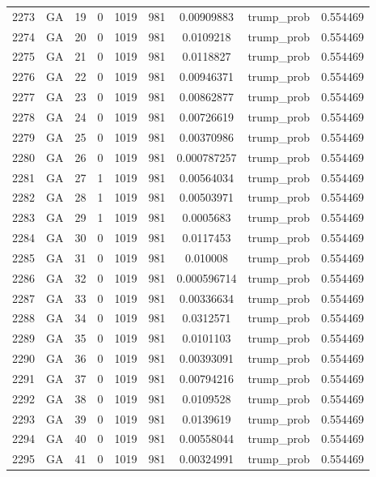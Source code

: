 \documentclass[12pt,a4paper]{article}
\begin{document}
\begin{tabular}{r|cccccccc}
	2273 & GA & 19 & 0 & 1019 & 981 & 0.00909883 & trump\_prob & 0.554469 \\
	2274 & GA & 20 & 0 & 1019 & 981 & 0.0109218 & trump\_prob & 0.554469 \\
	2275 & GA & 21 & 0 & 1019 & 981 & 0.0118827 & trump\_prob & 0.554469 \\
	2276 & GA & 22 & 0 & 1019 & 981 & 0.00946371 & trump\_prob & 0.554469 \\
	2277 & GA & 23 & 0 & 1019 & 981 & 0.00862877 & trump\_prob & 0.554469 \\
	2278 & GA & 24 & 0 & 1019 & 981 & 0.00726619 & trump\_prob & 0.554469 \\
	2279 & GA & 25 & 0 & 1019 & 981 & 0.00370986 & trump\_prob & 0.554469 \\
	2280 & GA & 26 & 0 & 1019 & 981 & 0.000787257 & trump\_prob & 0.554469 \\
	2281 & GA & 27 & 1 & 1019 & 981 & 0.00564034 & trump\_prob & 0.554469 \\
	2282 & GA & 28 & 1 & 1019 & 981 & 0.00503971 & trump\_prob & 0.554469 \\
	2283 & GA & 29 & 1 & 1019 & 981 & 0.0005683 & trump\_prob & 0.554469 \\
	2284 & GA & 30 & 0 & 1019 & 981 & 0.0117453 & trump\_prob & 0.554469 \\
	2285 & GA & 31 & 0 & 1019 & 981 & 0.010008 & trump\_prob & 0.554469 \\
	2286 & GA & 32 & 0 & 1019 & 981 & 0.000596714 & trump\_prob & 0.554469 \\
	2287 & GA & 33 & 0 & 1019 & 981 & 0.00336634 & trump\_prob & 0.554469 \\
	2288 & GA & 34 & 0 & 1019 & 981 & 0.0312571 & trump\_prob & 0.554469 \\
	2289 & GA & 35 & 0 & 1019 & 981 & 0.0101103 & trump\_prob & 0.554469 \\
	2290 & GA & 36 & 0 & 1019 & 981 & 0.00393091 & trump\_prob & 0.554469 \\
	2291 & GA & 37 & 0 & 1019 & 981 & 0.00794216 & trump\_prob & 0.554469 \\
	2292 & GA & 38 & 0 & 1019 & 981 & 0.0109528 & trump\_prob & 0.554469 \\
	2293 & GA & 39 & 0 & 1019 & 981 & 0.0139619 & trump\_prob & 0.554469 \\
	2294 & GA & 40 & 0 & 1019 & 981 & 0.00558044 & trump\_prob & 0.554469 \\
	2295 & GA & 41 & 0 & 1019 & 981 & 0.00324991 & trump\_prob & 0.554469 \\

\end{tabular}
\end{document}
